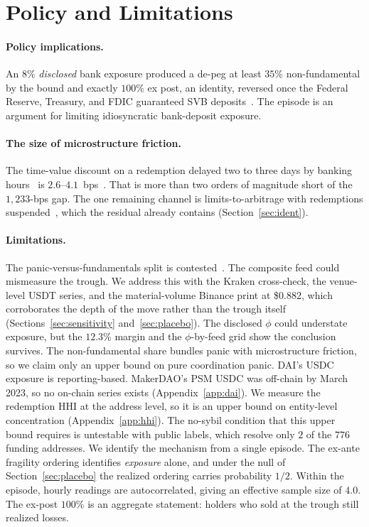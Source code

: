 \section{Policy and Limitations}
\label{sec:disc}

\paragraph{Policy implications.} An $8\%$ \emph{disclosed} bank exposure produced a de-peg at least
$35\%$ non-fundamental by the bound and exactly $100\%$ ex post, an identity, reversed once the Federal
Reserve, Treasury, and FDIC guaranteed SVB deposits~\cite{fedtreasfdic2023pressrelease}. The episode
is an argument for limiting idiosyncratic bank-deposit exposure.

\paragraph{The size of microstructure friction.} The time-value discount on a
redemption delayed two to three days by banking hours~\cite{watsky2024} is
$2.6$--$4.1$~bps~\cite{ustreasury2023daily}. That is more than two orders of magnitude short of the
$1{,}233$-bps gap. The one remaining channel is limits-to-arbitrage with redemptions
suspended~\cite{shleifervishny1997,grombvayanos2010}, which the residual already contains
(Section~\ref{sec:ident}).

\paragraph{Limitations.} The panic-versus-fundamentals split is contested~\cite{anadu2024,watsky2024}. The composite feed could
mismeasure the trough. We address this with the Kraken cross-check, the venue-level USDT series, and
the material-volume Binance print at \$0.882, which corroborates the depth of the move rather than
the trough itself (Sections~\ref{sec:sensitivity} and~\ref{sec:placebo}). The disclosed $\phi$ could understate exposure, but the
$12.3\%$ margin and the $\phi$-by-feed grid show the conclusion survives. The non-fundamental share bundles panic with microstructure friction, so we claim only an upper bound on pure coordination panic.
DAI's USDC exposure is
reporting-based. MakerDAO's PSM USDC was off-chain by March 2023, so no on-chain series exists
(Appendix~\ref{app:dai}). We measure the redemption HHI at the address level, so it is an upper bound
on entity-level concentration (Appendix~\ref{app:hhi}). The no-sybil condition that this upper bound
requires is untestable with public labels, which resolve only $2$ of the $776$ funding addresses. We
identify the mechanism from a single episode. The ex-ante fragility ordering identifies \emph{exposure}
alone, and under the null of Section~\ref{sec:placebo} the realized ordering carries
probability $1/2$. Within the
episode, hourly readings are autocorrelated, giving an effective sample size of $4.0$.
The ex-post $100\%$ is an aggregate statement: holders who sold at the trough still realized losses.

